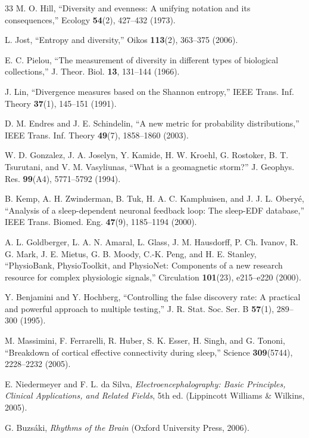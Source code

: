 \documentclass[aip,cha,reprint,amsmath,amssymb]{revtex4-2}
\begin{document}
\begin{thebibliography}{33}
 M. O. Hill, ``Diversity and evenness: A unifying notation and its consequences,'' Ecology \textbf{54}(2), 427--432 (1973).

 L. Jost, ``Entropy and diversity,'' Oikos \textbf{113}(2), 363--375 (2006).

 E. C. Pielou, ``The measurement of diversity in different types of biological collections,'' J. Theor. Biol. \textbf{13}, 131--144 (1966).

 J. Lin, ``Divergence measures based on the Shannon entropy,'' IEEE Trans. Inf. Theory \textbf{37}(1), 145--151 (1991).

 D. M. Endres and J. E. Schindelin, ``A new metric for probability distributions,'' IEEE Trans. Inf. Theory \textbf{49}(7), 1858--1860 (2003).

 W. D. Gonzalez, J. A. Joselyn, Y. Kamide, H. W. Kroehl, G. Rostoker, B. T. Tsurutani, and V. M. Vasyliunas, ``What is a geomagnetic storm?'' J. Geophys. Res. \textbf{99}(A4), 5771--5792 (1994).

 B. Kemp, A. H. Zwinderman, B. Tuk, H. A. C. Kamphuisen, and J. J. L. Obery{\'e}, ``Analysis of a sleep-dependent neuronal feedback loop: The sleep-EDF database,'' IEEE Trans. Biomed. Eng. \textbf{47}(9), 1185--1194 (2000).

 A. L. Goldberger, L. A. N. Amaral, L. Glass, J. M. Hausdorff, P. Ch. Ivanov, R. G. Mark, J. E. Mietus, G. B. Moody, C.-K. Peng, and H. E. Stanley, ``PhysioBank, PhysioToolkit, and PhysioNet: Components of a new research resource for complex physiologic signals,'' Circulation \textbf{101}(23), e215--e220 (2000).

 Y. Benjamini and Y. Hochberg, ``Controlling the false discovery rate: A practical and powerful approach to multiple testing,'' J. R. Stat. Soc. Ser. B \textbf{57}(1), 289--300 (1995).

 M. Massimini, F. Ferrarelli, R. Huber, S. K. Esser, H. Singh, and G. Tononi, ``Breakdown of cortical effective connectivity during sleep,'' Science \textbf{309}(5744), 2228--2232 (2005).

 E. Niedermeyer and F. L. da Silva, \emph{Electroencephalography: Basic Principles, Clinical Applications, and Related Fields}, 5th ed. (Lippincott Williams \& Wilkins, 2005).

 G. Buzs{\'a}ki, \emph{Rhythms of the Brain} (Oxford University Press, 2006).


\end{thebibliography}
\end{document}

